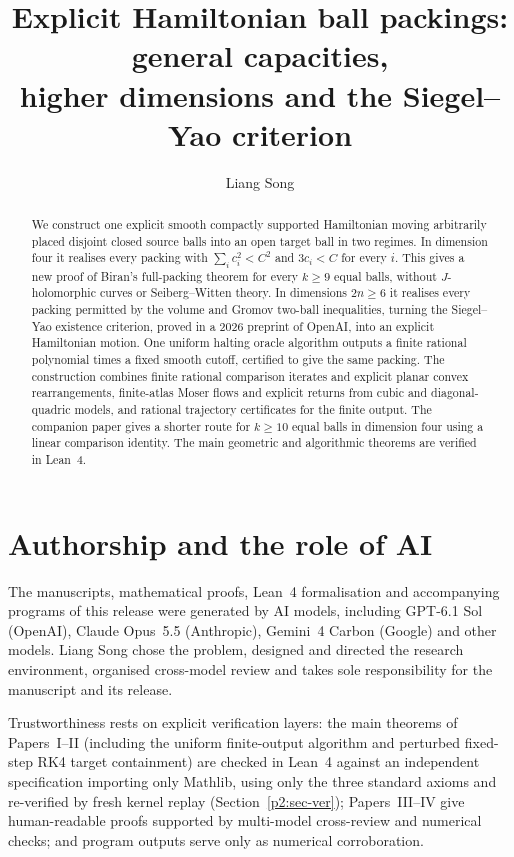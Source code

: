 \documentclass[11pt]{amsart}
\title[Explicit Hamiltonian ball packings: general capacities]{Explicit Hamiltonian ball packings: general capacities,\\ higher dimensions and the Siegel--Yao criterion}
\author{Liang Song}
\date{}
\begin{document}
\begin{abstract}
We construct one explicit smooth compactly supported Hamiltonian moving arbitrarily placed disjoint closed source
balls into an open target ball in two regimes. In dimension four it realises every packing with
$\sum_i c_i^2<C^2$ and $3c_i<C$ for every $i$. This gives a new proof of Biran's full-packing theorem for every
$k\ge9$ equal balls, without $J$-holomorphic curves or Seiberg--Witten theory. In dimensions $2n\ge6$ it realises
every packing permitted by the volume and Gromov two-ball inequalities, turning the Siegel--Yao existence criterion,
proved in a 2026 preprint of OpenAI, into an explicit Hamiltonian motion.
One uniform halting oracle algorithm outputs a finite rational polynomial times a fixed smooth cutoff, certified to
give the same packing. The construction combines finite rational comparison iterates and explicit planar convex
rearrangements, finite-atlas Moser flows and explicit returns from cubic and diagonal-quadric models, and rational
trajectory certificates for the finite output. The companion paper gives a shorter route for $k\ge10$ equal balls
in dimension four using a linear comparison identity. The main geometric and algorithmic theorems are verified in
Lean~4.
\end{abstract}
\maketitle








\section*{Authorship and the role of AI}

The manuscripts, mathematical proofs, Lean~4 formalisation and accompanying programs of this release were generated by
AI models, including GPT-6.1 Sol (OpenAI), Claude Opus~5.5 (Anthropic), Gemini~4 Carbon (Google) and other models.
Liang Song chose the problem, designed and directed the research environment, organised cross-model review and takes
sole responsibility for the manuscript and its release.

Trustworthiness rests on explicit verification layers: the main theorems of Papers~I--II (including the uniform
finite-output algorithm and perturbed fixed-step RK4 target containment) are checked in Lean~4 against an independent
specification importing only Mathlib, using only the three standard axioms and re-verified by fresh kernel replay
(Section~\ref{p2:sec-ver}); Papers~III--IV give human-readable proofs supported by multi-model cross-review and
numerical checks; and program outputs serve only as numerical corroboration.



\end{document}
